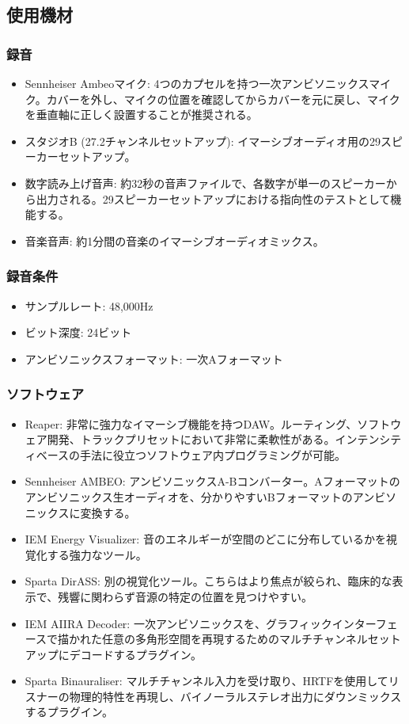 \documentclass[a4paper, 12pt]{article}
\begin{document}
\subsection{使用機材}

\subsubsection{録音}

\begin{itemize}
    \item Sennheiser Ambeoマイク: 4つのカプセルを持つ一次アンビソニックスマイク。カバーを外し、マイクの位置を確認してからカバーを元に戻し、マイクを垂直軸に正しく設置することが推奨される。
    \item スタジオB (27.2チャンネルセットアップ): イマーシブオーディオ用の29スピーカーセットアップ。
    \item 数字読み上げ音声: 約32秒の音声ファイルで、各数字が単一のスピーカーから出力される。29スピーカーセットアップにおける指向性のテストとして機能する。
    \item 音楽音声: 約1分間の音楽のイマーシブオーディオミックス。
\end{itemize}

\subsubsection{録音条件}
\begin{itemize}
    \item サンプルレート: 48,000Hz
    \item ビット深度: 24ビット
    \item アンビソニックスフォーマット: 一次Aフォーマット
\end{itemize}

\subsubsection{ソフトウェア}
\begin{itemize}
    \item Reaper: 非常に強力なイマーシブ機能を持つDAW。ルーティング、ソフトウェア開発、トラックプリセットにおいて非常に柔軟性がある。インテンシティベースの手法に役立つソフトウェア内プログラミングが可能。
    \item Sennheiser AMBEO: アンビソニックスA-Bコンバーター。Aフォーマットのアンビソニックス生オーディオを、分かりやすいBフォーマットのアンビソニックスに変換する。
    \item IEM Energy Visualizer: 音のエネルギーが空間のどこに分布しているかを視覚化する強力なツール。
    \item Sparta DirASS: 別の視覚化ツール。こちらはより焦点が絞られ、臨床的な表示で、残響に関わらず音源の特定の位置を見つけやすい。
    \item IEM AIIRA Decoder: 一次アンビソニックスを、グラフィックインターフェースで描かれた任意の多角形空間を再現するためのマルチチャンネルセットアップにデコードするプラグイン。
    \item Sparta Binauraliser: マルチチャンネル入力を受け取り、HRTFを使用してリスナーの物理的特性を再現し、バイノーラルステレオ出力にダウンミックスするプラグイン。
\end{itemize}
\end{document}
